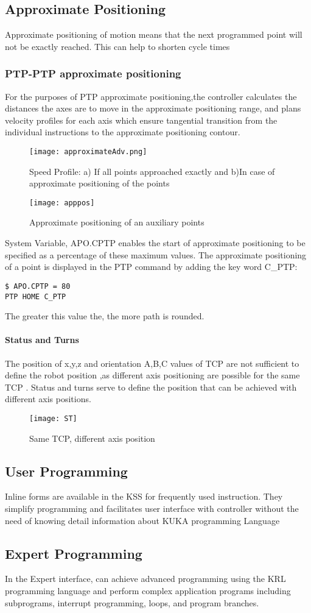 \subsection{Approximate Positioning}
Approximate positioning of motion means that the next programmed point will not be exactly reached. This can help to shorten cycle times

\subsubsection{PTP-PTP approximate positioning }
For the purposes of PTP approximate positioning,the controller calculates the distances the axes are to move in the approximate positioning range, and plans velocity profiles for each axis which ensure tangential transition from the individual instructions to the approximate positioning contour.
 \begin{figure}[H]
    \centering
    \texttt{[image: approximateAdv.png]}
    \caption[Speed Profiles]{Speed Profile: a) If all points approached exactly and b)In  case of approximate positioning of the points}
\end{figure}
\begin{figure}[H]
    \centering
    \texttt{[image: apppos]}
    \caption{Approximate positioning of an auxiliary points}
\end{figure}
 System Variable, \textdollar APO.CPTP enables the start of approximate positioning to be specified as a percentage of these maximum values.
The approximate positioning of a point is displayed in the PTP command by adding the key word C\_PTP: 
\begin{lstlisting}[language=terCmd]
$ APO.CPTP = 80
PTP HOME C_PTP
\end{lstlisting}
The greater this value the, the more path is rounded.


\paragraph{Status and Turns}
The position of x,y,z and orientation A,B,C values of TCP are not sufficient to define the robot position ,as different axis positioning  are possible for the same TCP .
Status and turns serve to define the position that can be achieved with different axis positions.
\begin{figure}[H]
	\centering
	\texttt{[image: ST]}
    	\caption{Same TCP, different axis position}
\end{figure}
\subsection{User Programming}
Inline forms are available in the KSS for frequently used instruction. They simplify programming and facilitates user interface with controller without the need of knowing detail information about KUKA programming Language

 \subsection{Expert Programming}
 In the Expert interface, can achieve advanced programming using the KRL programming language and perform complex application programs including subprograms, interrupt programming, loops, and program branches.
